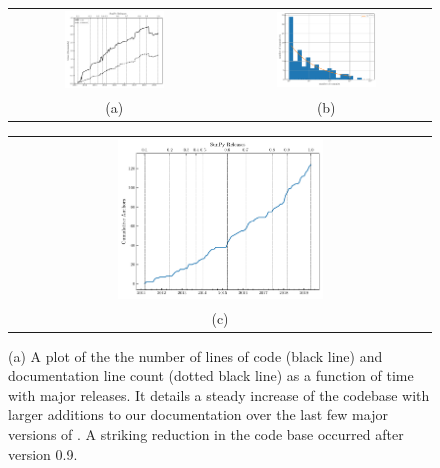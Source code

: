 \begin{figure}
\begin{tabular}{cc}
  \includegraphics[width=0.5\textwidth]{figures/fig_loc_vs_time.pdf} &
  \includegraphics[width=0.5\textwidth]{figures/busfactor_plot.pdf} \\
(a) & (b) \\
\end{tabular}
\begin{tabular}{c}
  \includegraphics[width=0.5\textwidth]{figures/cumulative_authors.pdf} \\
(c) \\
\end{tabular}
\caption{
	(a) A plot of the the number of lines of code (black line) and documentation line count (dotted black line) as a function of time with major releases.
	It details a steady increase of the \sunpypkg codebase with larger additions to our documentation over the last few major versions of \sunpypkg.
	A striking reduction in the code base occurred after version 0.9.
}
\end{figure}
